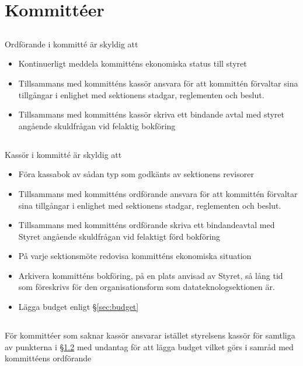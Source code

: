 \documentclass[a4paper, 10pt]{article}
\begin{document}
\section{Kommittéer}
\label{sec:kommitteer}

\subsection{}
Ordförande i kommitté är skyldig att
\begin{itemize}
\item Kontinuerligt meddela kommitténs ekonomiska status till styret
\item Tillsammans med kommitténs kassör ansvara för att kommittén förvaltar sina tillgångar i enlighet med sektionens stadgar, reglementen och beslut.
\item Tillsammans med kommitténs kassör skriva ett bindande avtal med styret angående skuldfrågan vid felaktig bokföring
\end{itemize}
\subsection{}
\label{sec:kommittee_kassor}
Kassör i kommitté är skyldig att
\begin{itemize}
\item Föra kassabok av sådan typ som godkänts av sektionens revisorer
\item Tillsammans med kommitténs ordförande ansvara för att kommittén förvaltar sina tillgångar i enlighet med sektionens stadgar, reglementen och beslut.
\item Tillsammans med kommitténs ordförande skriva ett bindandeavtal med Styret angående skuldfrågan vid felaktigt förd bokföring
\item På varje sektionsmöte redovisa kommitténs ekonomiska situation
\item Arkivera kommitténs bokföring, på en plats anvisad av Styret, så lång tid som föreskrivs för den organisationsform som datateknologsektionen är.
\item Lägga budget enligt \S\ref{sec:budget}
\end{itemize}
\subsection{}
För kommittéer som saknar kassör ansvarar istället styrelsens kassör för samtliga av punkterna i \S\ref{sec:kommittee_kassor} med undantag för att lägga budget vilket görs i samråd med kommittéens ordförande
\end{document}
